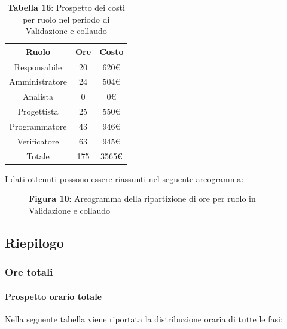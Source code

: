 \begin{table}[H]
	\centering
	\renewcommand{\arraystretch}{1.5}
	\begin{tabular}{|c|c|c|}
		\hline
		\rowcolor{lighter-grayer}
		Ruolo & Ore & Costo \\
		\hline
		Responsabile & 20 & 620\euro \\
		\hline
		Amministratore & 24 & 504\euro \\
		\hline
		Analista & 0 & 0\euro \\
		\hline
		Progettista & 25 & 550\euro \\
		\hline
		Programmatore & 43 & 946\euro \\
		\hline
		Verificatore & 63 & 945\euro \\
		\hline
		Totale & 175 &  3565\euro \\
		\hline
	\end{tabular}
\caption*{\textbf{Tabella 16}: Prospetto dei costi per ruolo nel periodo di Validazione e collaudo\\}
\end{table}

I dati ottenuti possono essere riassunti nel seguente areogramma:


\begin{figure}[H]
	\centering
	\caption*{\textbf{Figura 10}: Areogramma della ripartizione di ore per ruolo in Validazione e collaudo}
	\label{fig:Figura10}
\end{figure}

\subsection{Riepilogo}
\subsubsection{Ore totali}
\paragraph{Prospetto orario totale}
Nella seguente tabella viene riportata la distribuzione oraria di tutte le fasi:

